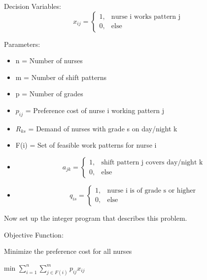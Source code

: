 Decision Variables:
\begin{displaymath}
   x_{ij} = \left\{
     \begin{array}{lr}
       1, & \text{nurse i works pattern j}\\
       0, & \text{else}
     \end{array}
   \right.
\end{displaymath}



Parameters:
\begin{itemize}
\item n = Number of nurses
\item m = Number of shift patterns
\item p = Number of grades
\item $p_{ij}$ = Preference cost of nurse i working pattern j
\item $R_{ks}$ = Demand of nurses with grade s on day/night k
\item F(i) = Set of feasible work patterns for nurse i
\item \begin{displaymath}
   a_{jk} = \left\{
     \begin{array}{lr}
       1, & \text{shift pattern j covers day/night k}\\
       0, & \text{else}
     \end{array}
   \right.
\end{displaymath}
\item \begin{displaymath}
   q_{is} = \left\{
     \begin{array}{lr}
       1, & \text{nurse i is of grade s or higher}\\
       0, & \text{else}
     \end{array}
   \right.
\end{displaymath}
\end{itemize}



Now set up the integer program that describes this problem.


Objective Function:

Minimize the preference cost for all nurses
\begin{center}
min $\displaystyle\sum_{i=1}^{n} \displaystyle\sum_{j\in F(i)}^{m} p_{ij}x_{ij}$
\end{center}



